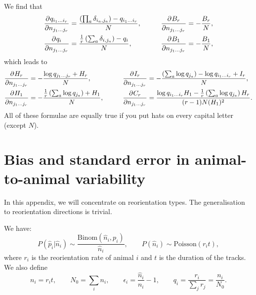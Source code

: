 \documentclass[12pt]{article}
\begin{document}
We find that
%
\begin{equation}\label{eq:dqbydn}
  \begin{aligned}
    \pdiff{q_{i_1\ldots i_r}}{n_{j_1\ldots j_r}} &= \frac{\prn{\prod_a \delta_{i_a,j_a}} - q_{i_1\ldots i_r}}{N}, &
    \qquad
    \pdiff{B_{r}}{n_{j_1\ldots j_r}} &= -\frac{B_r}{N},\\
    \pdiff{q_{i}}{n_{j_1\ldots j_r}} &= \frac{\frac{1}{r} \prn{\sum_a \delta_{i,j_a}} - q_{i}}{N}, &
    \pdiff{B_{1}}{n_{j_1\ldots j_r}} &= -\frac{B_1}{N},
   \end{aligned}
\end{equation}
%
which leads to
%
\begin{equation}\label{eq:dhbydn}
  \begin{aligned}
    \pdiff{H_r}{n_{j_1\ldots j_r}} &= -\frac{\log q_{j_1\ldots j_r} + H_r}{N}, &
    \qquad
    \pdiff{I_{r}}{n_{j_1\ldots j_r}} &= -\frac{\prn{\sum_a \log q_{j_a}}-\log q_{i_1\ldots i_r} + I_r}{N}, \\
    \pdiff{H_1}{n_{j_1\ldots j_r}} &= -\frac{\frac{1}{r} \prn{\sum_a \log q_{j_a}} + H_1}{N}, &
    \pdiff{C_{r}}{n_{j_1\ldots j_r}} &= \frac{\log q_{i_1\ldots i_r} H_1 - \frac{1}{r} \prn{\sum_a \log q_{j_a}} H_r}{(r-1)N(H_1)^2}.
   \end{aligned}
\end{equation}
%
All of these formulae are equally true if you put hats on every capital letter (except $N$).


\section{Bias and standard error in animal-to-animal variability}\label{sec:varibias}

In this appendix, we will concentrate on reorientation types. The generalisation to reorientation directions is trivial.

We have:
%
\begin{equation}\label{eq:estdist}
  P(\hat{p}_i|\hat{n}_i) \sim \frac{\mathrm{Binom}(\hat{n}_i,p_i)}{\hat{n}_i},
  \qquad
  P(\hat{n}_i) \sim \mathrm{Poisson}(r_it),
\end{equation}
%
where $r_i$ is the reorientation rate of animal $i$ and $t$ is the duration of the tracks. We also define
%
\begin{equation}\label{eq:biasnot}
  n_i = r_it, \qquad
  N_0 = \sum_i n_i, \qquad
  \epsilon_i = \frac{\hat{n}_i}{n_i}-1, \qquad
  q_i = \frac{r_i}{\sum_j r_j} = \frac{n_i}{N_0}.
\end{equation}
%
\end{document}
